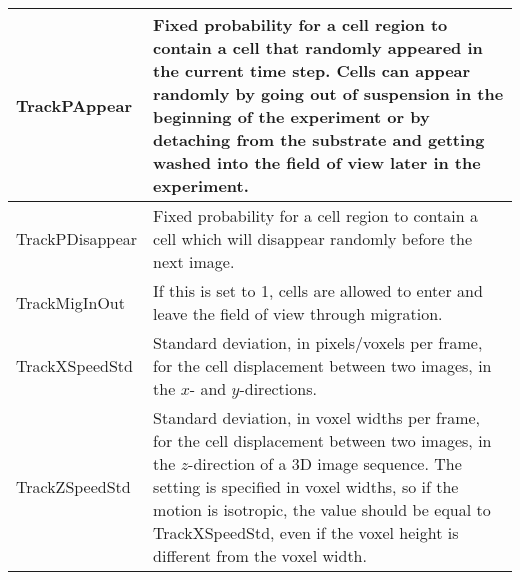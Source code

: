\begin{longtable}{lX}
TrackPAppear & Fixed probability for a cell region to contain a cell that randomly appeared in the current time step. Cells can appear randomly by going out of suspension in the beginning of the experiment or by detaching from the substrate and getting washed into the field of view later in the experiment. \\[5pt] \hline

TrackPDisappear & Fixed probability for a cell region to contain a cell which will disappear randomly before the next image. \\[5pt] \hline

TrackMigInOut & If this is set to 1, cells are allowed to enter and leave the field of view through migration. \\[5pt] \hline

TrackXSpeedStd & Standard deviation, in pixels/voxels per frame, for the cell displacement between two images, in the $x$- and $y$-directions. \\[5pt] \hline

TrackZSpeedStd & Standard deviation, in voxel widths per frame, for the cell displacement between two images, in the $z$-direction of a 3D image sequence. The setting is specified in voxel widths, so if the motion is isotropic, the value should be equal to TrackXSpeedStd, even if the voxel height is different from the voxel width.\\[5pt] \hline






\end{longtable}
